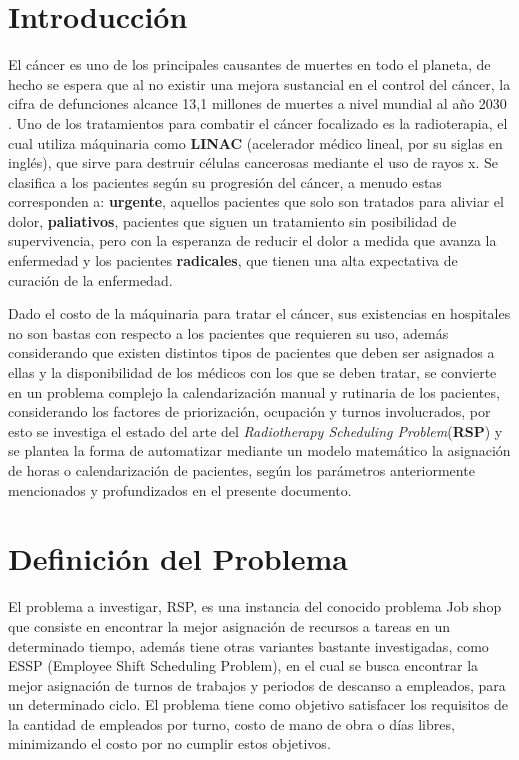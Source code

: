\documentclass[letter, 10pt]{article}
\begin{document}
\section{Introducci\'on}
El cáncer es uno de los principales causantes de muertes en todo el planeta, de hecho se espera que al no existir una mejora sustancial en el control del cáncer, la cifra de defunciones alcance 13,1 millones de muertes a nivel mundial al año 2030 \cite{nueve}. Uno de los tratamientos para combatir el cáncer focalizado es la radioterapia, el cual utiliza máquinaria como \textbf{LINAC} (acelerador médico lineal, por su siglas en inglés), que sirve para destruir células cancerosas mediante el uso de rayos x. Se clasifica a los pacientes según su progresión del cáncer, a menudo estas corresponden a: \textbf{urgente}, aquellos pacientes que solo son tratados para aliviar el dolor, \textbf{paliativos}, pacientes que siguen un tratamiento sin posibilidad de supervivencia, pero con la esperanza de reducir el dolor a medida que avanza la enfermedad y los pacientes \textbf{radicales}, que tienen una alta expectativa de curación de la enfermedad.


Dado el costo de la máquinaria para tratar el cáncer, sus existencias en hospitales no son bastas con respecto a los pacientes que requieren su uso, además considerando que existen distintos tipos de pacientes que deben ser asignados a ellas y la disponibilidad de los médicos con los que se deben tratar, se convierte en un problema complejo la calendarización manual y rutinaria de los pacientes, considerando los factores de priorización, ocupación y turnos involucrados, por esto se investiga el estado del arte del \textit{Radiotherapy Scheduling Problem}(\textbf{RSP})  y se plantea la forma de automatizar mediante un modelo matemático la asignación de horas o calendarización de pacientes, según los parámetros anteriormente mencionados y profundizados en el presente documento.

\section{Definición del Problema}
El problema a investigar, RSP, es una instancia del conocido problema Job shop\cite{tres} que consiste en encontrar la mejor asignación de recursos a tareas en un determinado tiempo, además tiene otras variantes bastante investigadas, como ESSP (Employee Shift Scheduling Problem), en el cual se busca encontrar la mejor asignación de turnos de trabajos y periodos de descanso a empleados, para un determinado ciclo. El problema tiene como objetivo satisfacer los requisitos de la cantidad de empleados por turno, costo de mano de obra o días libres, minimizando el costo por no cumplir estos objetivos.\cite{doce}
\end{document}
